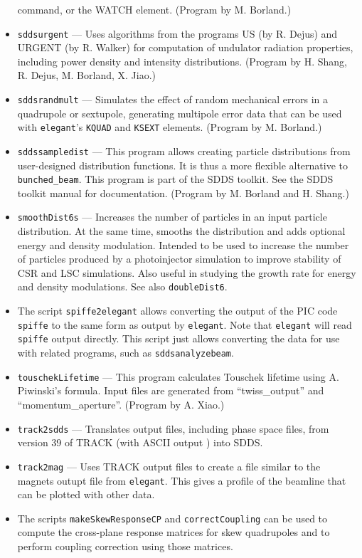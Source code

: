 \documentclass[11pt]{article}
\begin{document}
\begin{itemize}
        command, or the WATCH element. (Program by M. Borland.)
\item {\tt sddsurgent} --- Uses algorithms from the programs US (by R. Dejus) and URGENT (by R. Walker) for computation of undulator
  radiation properties, including power density and intensity distributions.  (Program by H. Shang, R. Dejus, M. Borland, X. Jiao.)
\item {\tt sddsrandmult} --- Simulates the effect of random mechanical errors in a quadrupole or sextupole,
  generating multipole error data that can be used with {\tt elegant}'s {\tt KQUAD} and {\tt KSEXT}
  elements. (Program by M. Borland.)
\item {\tt sddssampledist} --- This program allows creating particle
        distributions from user-designed distribution functions.  It is thus a more flexible alternative
        to \verb|bunched_beam|.  This program is part of the SDDS toolkit.  See the SDDS toolkit
        manual for documentation.  (Program by M. Borland and H. Shang.)
\item {\tt smoothDist6s} --- Increases the number of particles in an input particle distribution.  At the same
 time, smooths the distribution and adds optional energy and density modulation.   Intended to be used to increase the number of particles
 produced by a photoinjector simulation to improve stability of CSR and LSC simulations.  Also useful in studying 
 the growth rate for energy and density modulations.  See also {\tt doubleDist6}.
\item The script \verb|spiffe2elegant| allows converting the output of the PIC code \verb|spiffe| to the same form
  as output by \verb|elegant|.  Note that \verb|elegant| will read \verb|spiffe| output directly. This script just allows converting the
  data for use with related programs, such as \verb|sddsanalyzebeam|.
\item {\tt touschekLifetime} --- This program calculates Touschek lifetime using A. Piwinski's formula.
        Input files are generated from ``twiss\_output'' and ``momentum\_aperture''.  (Program by A. Xiao.)
\item {\tt track2sdds} --- Translates output files, including phase space files, from version 39 of TRACK (with ASCII output \cite{TRACK})
  into SDDS. 
\item {\tt track2mag} --- Uses TRACK output files to create a file similar to the magnets outupt file from {\tt elegant}.
  This gives a profile of the beamline that can be plotted with other data.
\item The scripts \verb|makeSkewResponseCP| and \verb|correctCoupling| can be used to compute the cross-plane response
  matrices for skew quadrupoles and to perform coupling correction using those matrices.
\end{itemize}
\end{document}
